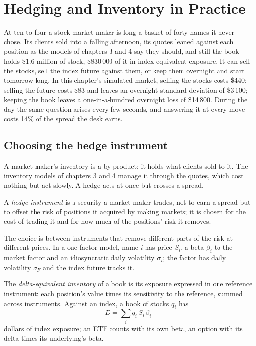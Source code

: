\chapter{Hedging and Inventory in Practice}\label{ch:hf:hedging-and-inventory-in-practice}

At ten to four a stock market maker is long a basket of forty names it never chose. Its clients sold into a falling afternoon, its quotes leaned
against each position as the models of chapters 3 and 4 say they should, and still the book holds \$1.6 million of stock, \$830\,000 of it in
index-equivalent exposure. It can sell the stocks, sell the index future against them, or keep them overnight and start tomorrow long. In this
chapter's simulated market, selling the stocks costs \$440; selling the future costs \$83 and leaves an overnight standard deviation of \$3\,100;
keeping the book leaves a one-in-a-hundred overnight loss of \$14\,800. During the day the same question arises every few seconds, and answering it
at every move costs 14\% of the spread the desk earns.

\section{Choosing the hedge instrument}

A market maker's inventory is a by-product: it holds what clients sold to it. The inventory models of chapters 3 and 4 manage it through the quotes,
which cost nothing but act slowly. A hedge acts at once but crosses a spread.

\begin{definition}\label{def:hf:hedging-and-inventory-in-practice:instrument}
A \emph{hedge instrument} is a security a market maker trades, not to earn a spread but to offset the risk of positions it
acquired by making markets; it is chosen for the cost of trading it and for how much of the positions' risk it removes.
\end{definition}

The choice is between instruments that remove different parts of the risk at different prices. In a one-factor model, name $i$ has price $S_i$, a
beta $\beta_i$ to the market factor and an idiosyncratic daily volatility $\sigma_i$; the factor has daily volatility $\sigma_F$ and the index future
tracks it.

\begin{definition}\label{def:hf:hedging-and-inventory-in-practice:delta}
The \emph{delta-equivalent inventory} of a book is its exposure expressed in one reference instrument: each
position's value times its sensitivity to the reference, summed across instruments. Against an index, a book of stocks $q_i$ has
\[
D=\sum_i q_i\,S_i\,\beta_i
\]
dollars of index exposure; an ETF counts with its own beta, an option with its delta times its underlying's beta.
\end{definition}

